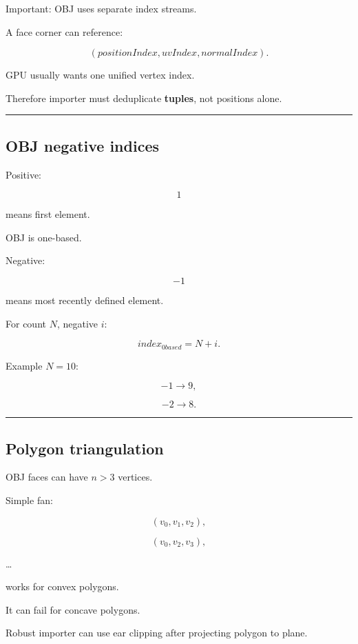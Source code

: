Important: OBJ uses separate index streams.

A face corner can reference:

\[
(positionIndex,
uvIndex,
normalIndex).
\]

GPU usually wants one unified vertex index.

Therefore importer must deduplicate \textbf{tuples}, not positions alone.

\begin{center}\rule{0.5\linewidth}{0.5pt}\end{center}

\subsection{OBJ negative indices}\label{04-visual-computing-ii-ch041-obj-negative-indices}

Positive:

\[
1
\]

means first element.

OBJ is one-based.

Negative:

\[
-1
\]

means most recently defined element.

For count \(N\), negative \(i\):

\[
\boxed{
index_{0based}
=
N+i.
}
\]

Example \(N=10\):

\[
-1\rightarrow9,
\]

\[
-2\rightarrow8.
\]

\begin{center}\rule{0.5\linewidth}{0.5pt}\end{center}

\subsection{Polygon triangulation}\label{04-visual-computing-ii-ch041-polygon-triangulation}

OBJ faces can have \(n>3\) vertices.

Simple fan:

\[
(v_0,v_1,v_2),
\]

\[
(v_0,v_2,v_3),
\]

\ldots{}

works for convex polygons.

It can fail for concave polygons.

Robust importer can use ear clipping after projecting polygon to plane.

